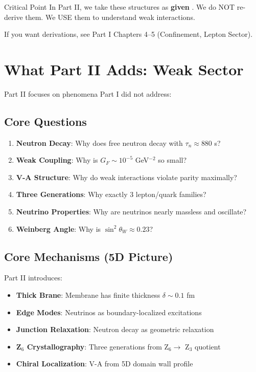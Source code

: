 \begin{statusbox}{Critical Point}
In Part II, we take these structures as \textbf{given} \tagDer.
We do NOT re-derive them. We USE them to understand weak interactions.

If you want derivations, see Part I Chapters 4--5 (Confinement, Lepton Sector).
\end{statusbox}

\section{What Part II Adds: Weak Sector}
\label{sec:bridge_weak}

Part II focuses on phenomena Part I did not address:

\subsection{Core Questions}

\begin{enumerate}
\item \textbf{Neutron Decay}: Why does free neutron decay with $\tau_n \approx 880$ s?
\item \textbf{Weak Coupling}: Why is $G_F \sim 10^{-5}$ GeV$^{-2}$ so small?
\item \textbf{V-A Structure}: Why do weak interactions violate parity maximally?
\item \textbf{Three Generations}: Why exactly 3 lepton/quark families?
\item \textbf{Neutrino Properties}: Why are neutrinos nearly massless and oscillate?
\item \textbf{Weinberg Angle}: Why is $\sin^2\theta_W \approx 0.23$?
\end{enumerate}

\subsection{Core Mechanisms (5D Picture)}

Part II introduces:

\begin{itemize}
\item \textbf{Thick Brane}: Membrane has finite thickness $\delta \sim 0.1$ fm
\item \textbf{Edge Modes}: Neutrinos as boundary-localized excitations
\item \textbf{Junction Relaxation}: Neutron decay as geometric relaxation
\item \textbf{Z$_6$ Crystallography}: Three generations from Z$_6 \to$ Z$_3$ quotient
\item \textbf{Chiral Localization}: V-A from 5D domain wall profile
\end{itemize}

